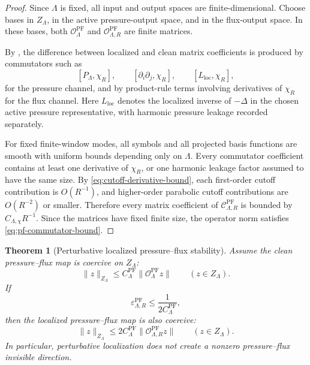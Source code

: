 \documentclass[11pt]{article}
\numberwithin{equation}{section}
\theoremstyle{plain}
\newtheorem{theorem}{Theorem}[section]
\theoremstyle{definition}
\theoremstyle{remark}
\newcommand{\PF}{\mathrm{PF}}
\newcommand{\loc}{\mathrm{loc}}
\newcommand{\calC}{\mathcal C}
\newcommand{\calO}{\mathcal O}
\begin{document}
\begin{proof}
Since \(\Lambda\) is fixed, all input and output spaces are finite-dimensional.  Choose bases in \(Z_\Lambda\), in the active pressure-output space, and in the flux-output space.  In these bases, both \(\calO^{\PF}_\Lambda\) and \(\calO^{\PF}_{\Lambda,R}\) are finite matrices.

By , the difference between localized and clean matrix coefficients is produced by commutators such as
\[
        [P_\Lambda,\chi_R],
        \qquad
        [\partial_i\partial_j,\chi_R],
        \qquad
        [L_{\loc},\chi_R],
\]
for the pressure channel, and by product-rule terms involving derivatives of \(\chi_R\) for the flux channel.  Here \(L_{\loc}\) denotes the localized inverse of \(-\Delta\) in the chosen active pressure representative, with harmonic pressure leakage recorded separately.

For fixed finite-window modes, all symbols and all projected basis functions are smooth with uniform bounds depending only on \(\Lambda\).  Every commutator coefficient contains at least one derivative of \(\chi_R\), or one harmonic leakage factor assumed to have the same size.  By \eqref{eq:cutoff-derivative-bound}, each first-order cutoff contribution is \(O(R^{-1})\), and higher-order parabolic cutoff contributions are \(O(R^{-2})\) or smaller.  Therefore every matrix coefficient of \(\calC^{\PF}_{\Lambda,R}\) is bounded by \(C_{\Lambda,\chi}R^{-1}\).  Since the matrices have fixed finite size, the operator norm satisfies \eqref{eq:pf-commutator-bound}.
\end{proof}

\begin{theorem}[Perturbative localized pressure--flux stability]
\label{thm:pf-perturbative-localized-stability}
Assume the clean pressure--flux map is coercive on \(Z_\Lambda\):
\begin{equation}
        \|z\|_{Z_\Lambda}
        \le
        C^{\PF}_\Lambda
        \|\calO^{\PF}_\Lambda z\|
        \qquad
        (z\in Z_\Lambda).
        \label{eq:clean-pf-coercivity-operator}
\end{equation}
If
\begin{equation}
        \varepsilon^{\PF}_{\Lambda,R}
        \le
        \frac{1}{2C^{\PF}_\Lambda},
        \label{eq:pf-localization-smallness}
\end{equation}
then the localized pressure--flux map is also coercive:
\begin{equation}
        \|z\|_{Z_\Lambda}
        \le
        2C^{\PF}_\Lambda
        \|\calO^{\PF}_{\Lambda,R}z\|
        \qquad
        (z\in Z_\Lambda).
        \label{eq:localized-pf-coercivity}
\end{equation}
In particular, perturbative localization does not create a nonzero pressure--flux invisible direction.
\end{theorem}
\end{document}
